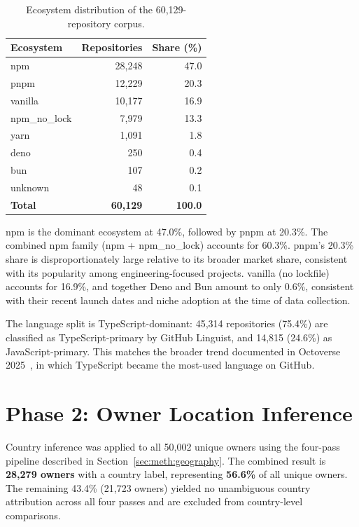 \begin{table}[h]
\centering
\caption{Ecosystem distribution of the 60,129-repository corpus.}
\label{tab:ecosystem}
\begin{tabular}{@{}lrr@{}}
\toprule
Ecosystem & Repositories & Share (\%) \\
\midrule
npm           & 28,248 & 47.0 \\
pnpm          & 12,229 & 20.3 \\
vanilla       & 10,177 & 16.9 \\
npm\_no\_lock &  7,979 & 13.3 \\
yarn          &  1,091 &  1.8 \\
deno          &    250 &  0.4 \\
bun           &    107 &  0.2 \\
unknown       &     48 &  0.1 \\
\midrule
\textbf{Total} & \textbf{60,129} & \textbf{100.0} \\
\bottomrule
\end{tabular}
\end{table}

npm is the dominant ecosystem at 47.0\%, followed by pnpm at 20.3\%. The combined npm family (npm + npm\_no\_lock) accounts for 60.3\%. pnpm's 20.3\% share is disproportionately large relative to its broader market share, consistent with its popularity among engineering-focused projects. vanilla (no lockfile) accounts for 16.9\%, and together Deno and Bun amount to only 0.6\%, consistent with their recent launch dates and niche adoption at the time of data collection.

The language split is TypeScript-dominant: 45,314 repositories (75.4\%) are classified as TypeScript-primary by GitHub Linguist, and 14,815 (24.6\%) as JavaScript-primary. This matches the broader trend documented in Octoverse 2025~\cite{octoverse2025}, in which TypeScript became the most-used language on GitHub.

\section{Phase 2: Owner Location Inference}
\label{sec:res:location}

Country inference was applied to all 50,002 unique owners using the four-pass pipeline described in Section~\ref{sec:meth:geography}. The combined result is \textbf{28,279 owners} with a country label, representing \textbf{56.6\%} of all unique owners. The remaining 43.4\% (21,723 owners) yielded no unambiguous country attribution across all four passes and are excluded from country-level comparisons.

